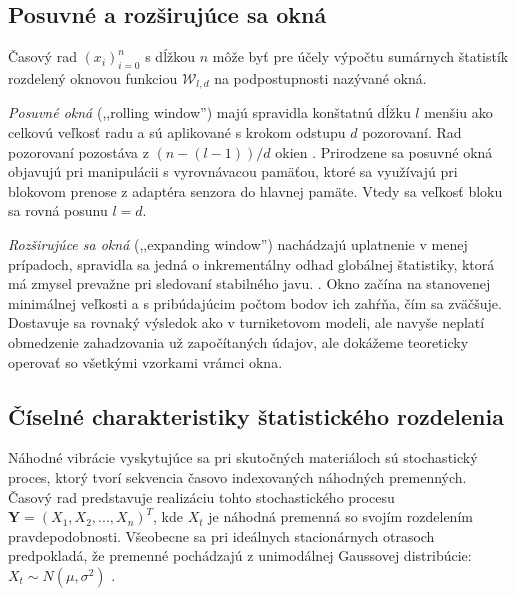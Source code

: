 \subsection{Posuvné a rozširujúce sa okná}
Časový rad $\left(x_i\right)_{i = 0}^{n}$ s dĺžkou $n$ môže byť pre účely výpočtu sumárnych štatistík rozdelený oknovou funkciou 
$\mathcal{W}_{l, d}$ na podpostupnosti nazývané okná. 

\emph{Posuvné okná} (,,rolling window'') majú spravidla konštatnú dĺžku $l$ 
menšiu ako celkovú veľkosť radu a sú aplikované s krokom odstupu $d$ pozorovaní. Rad pozorovaní pozostáva z $ (n - (l  - 1)) / d$ 
okien \cite{online-anomaly-detection}. Prirodzene sa posuvné okná objavujú pri manipulácii s vyrovnávacou pamäťou, ktoré sa využívajú 
pri blokovom prenose z adaptéra senzora do hlavnej pamäte. Vtedy sa veľkosť bloku sa rovná posunu $l = d$.

\emph{Rozširujúce sa okná} (,,expanding window'') nachádzajú uplatnenie v menej prípadoch, spravidla sa jedná o inkrementálny 
odhad globálnej štatistiky, ktorá má zmysel prevažne pri sledovaní stabilného javu. \cite{practical-time-series}. Okno začína na 
stanovenej minimálnej veľkosti a s pribúdajúcim počtom bodov ich zahŕňa, čím sa zväčšuje. Dostavuje sa rovnaký výsledok ako v 
turniketovom modeli, ale navyše neplatí obmedzenie zahadzovania už započítaných údajov, ale dokážeme teoreticky operovať so všetkými 
vzorkami vrámci okna.  

\subsection{Číselné charakteristiky štatistického rozdelenia}
Náhodné vibrácie vyskytujúce sa pri skutočných materiáloch sú stochastický proces, ktorý tvorí sekvencia časovo indexovaných 
náhodných premenných. Časový rad predstavuje realizáciu tohto stochastického procesu $\mathbf{Y} = (X_1, X_2, ..., X_n)^T$, kde $X_t$ 
je náhodná premenná so svojím rozdelením pravdepodobnosti. Všeobecne sa pri ideálnych stacionárnych otrasoch predpokladá, že premenné 
pochádzajú z unimodálnej Gaussovej distribúcie: $X_t \sim N(\mu, \sigma^2)$ \cite{vibrations-shock}. 

